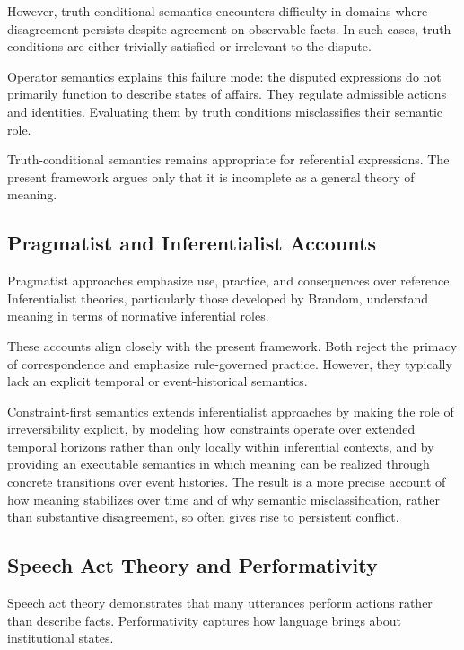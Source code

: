 \documentclass[11pt]{article}
\begin{document}
However, truth-conditional semantics encounters difficulty in domains where
disagreement persists despite agreement on observable facts. In such cases,
truth conditions are either trivially satisfied or irrelevant to the dispute.

Operator semantics explains this failure mode: the disputed expressions do not
primarily function to describe states of affairs. They regulate admissible
actions and identities. Evaluating them by truth conditions misclassifies their
semantic role.

Truth-conditional semantics remains appropriate for referential expressions. The
present framework argues only that it is incomplete as a general theory of
meaning.

\subsection{Pragmatist and Inferentialist Accounts}

Pragmatist approaches emphasize use, practice, and consequences over reference.
Inferentialist theories, particularly those developed by Brandom, understand
meaning in terms of normative inferential roles.

These accounts align closely with the present framework. Both reject the
primacy of correspondence and emphasize rule-governed practice. However, they
typically lack an explicit temporal or event-historical semantics.

Constraint-first semantics extends inferentialist approaches by making the role of
irreversibility explicit, by modeling how constraints operate over extended
temporal horizons rather than only locally within inferential contexts, and by
providing an executable semantics in which meaning can be realized through
concrete transitions over event histories. The result is a more precise account
of how meaning stabilizes over time and of why semantic misclassification, rather
than substantive disagreement, so often gives rise to persistent conflict.

\subsection{Speech Act Theory and Performativity}

Speech act theory demonstrates that many utterances perform actions rather than
describe facts. Performativity captures how language brings about institutional
states.
\end{document}

